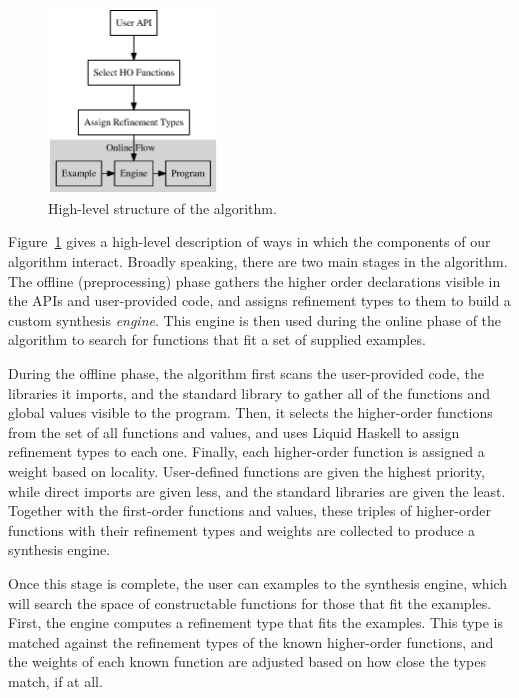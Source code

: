 

\begin{figure}[t]
  \centering
  \includegraphics[width=0.4\textwidth]{algo}
  \caption{High-level structure of the algorithm.}
  \label{fig:high_level_overview}
\end{figure}

Figure~\ref{fig:high_level_overview} gives a high-level description of ways in which the components of our algorithm interact. Broadly speaking, there are two main stages in the algorithm. The offline (preprocessing) phase gathers the higher order declarations visible in the APIs and user-provided code, and assigns refinement types to them to build a custom synthesis \textit{engine}. This engine is then used during the online phase of the algorithm to search for functions that fit a set of supplied examples.

During the offline phase, the algorithm first scans the user-provided code, the libraries it imports, and the standard library to gather all of the functions and global values visible to the program. Then, it selects the higher-order functions from the set of all functions and values, and uses Liquid Haskell \cite{liquidhaskell} to assign refinement types to each one. Finally, each higher-order function is assigned a weight based on locality\cite{insynthPLDI}. User-defined functions are given the highest priority, while direct imports are given less, and the standard libraries are given the least. Together with the first-order functions and values, these triples of higher-order functions with their refinement types and weights are collected to produce a synthesis engine.

Once this stage is complete, the user can examples to the synthesis engine, which will search the space of constructable functions for those that fit the examples. First, the engine computes a refinement type that fits the examples. This type is matched against the refinement types of the known higher-order functions, and the weights of each known function are adjusted based on how close the types match, if at all.


